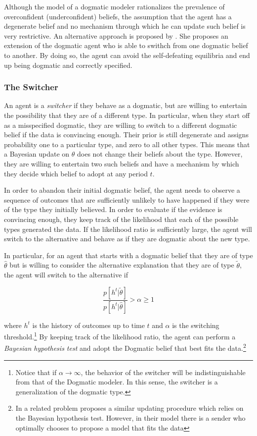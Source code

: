 \documentclass[
  12pt,
]{article}
\begin{document}
Although the model of a dogmatic modeler rationalizes the prevalence of
overconfident (underconfident) beliefs, the assumption that the agent
has a degenerate belief and no mechanism through which he can update
such belief is very restrictive. An alternative approach is proposed by
\citet{Ba2023}. She proposes an extension of the dogmatic agent who is
able to swithch from one dogmatic belief to another. By doing so, the
agent can avoid the self-defeating equilibria and end up being dogmatic
and correctly specified.

\hypertarget{the-switcher}{%
\subsubsection{The Switcher}\label{the-switcher}}

An agent is a \emph{switcher} if they behave as a dogmatic, but are
willing to entertain the possibility that they are of a different type.
In particular, when they start off as a misspecified dogmatic, they are
willing to switch to a different dogmatic belief if the data is
convincing enough. Their prior is still degenerate and assigns
probability one to a particular type, and zero to all other types. This
means that a Bayesian update on \(\theta\) does not change their beliefs
about the type. However, they are willing to entertain two such beliefs
and have a mechanism by which they decide which belief to adopt at any
period \(t\).

In order to abandon their initial dogmatic belief, the agent needs to
observe a sequence of outcomes that are sufficiently unlikely to have
happened if they were of the type they initially believed. In order to
evaluate if the evidence is convincing enough, they keep track of the
likelihood that each of the possible types generated the data. If the
likelihood ratio is sufficiently large, the agent will switch to the
alternative and behave as if they are dogmatic about the new type.

In particular, for an agent that starts with a dogmatic belief that they
are of type \(\hat{\theta}\) but is willing to consider the alternative
explanation that they are of type \(\tilde{\theta}\), the agent will
switch to the alternative if

\[\frac{p[h^t|\tilde{\theta}]}{p[h^t|\hat{\theta}]} > \alpha\geq 1\]

where \(h^t\) is the history of outcomes up to time \(t\) and \(\alpha\)
is the switching
threshold.\footnote{Notice that if $\alpha \to \infty$, the behavior of the switcher will be indistinguishable from that of the Dogmatic modeler. 
In this sense, the switcher is a generalization of the dogmatic type.}
By keeping track of the likelihood ratio, the agent can perform a
\emph{Bayesian hypothesis test} and adopt the Dogmatic belief that best
fits the
data.\footnote{In a related problem \citet{Schwarstein2021} proposes a similar updating procedure which relies on the Bayesian hypothesis test. However, in their model there is a sender who optimally chooses to propose a model that fits the data}
\end{document}
